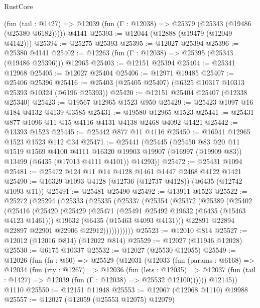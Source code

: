 \begin{lexlean}{RustCore}
\begin{coremodule}
    (fun (tail : @1427) => @12039 (fun (Γ : @12038) => @25379 (@25343 (@19486 (@25380 @6182)))))
    @4141
@25393 := @12044 (@12888 (@19479 (@12049 @4142)))
@25394 := @25275 @25393
@25395 := @12027 @25394
@25396 := @25380 @4141
@25402 := @12263 (fun (Γ : @12038) => @25395 (@25343 (@19486 @25396))) @12965
@25403 := @12151 @25394
@25404 := @25341 @12968
@25405 := @12027 @25404
@25406 := @12971 @19485
@25407 := @25406 @25396
@25416 := @25403 (@25405 @25407) (@6325 @10317 @10313 @25393 @10324 (@6196 @25393))
@25420 := @12151 @25404 @25407 (@12338 @25340)
@25423 := @19567 @12965 @1523 @950
@25429 := @25423 @1097 @16 @184 @4132 @4139 @3585
@25431 := @19580 @12965 @1523
@25441 := @25431 @877 @1096 @11 @15 @4116 @4131 @4138 @2468 @4092 @1421
@25442 := @13393 @1523
@25445 := @25442 @877 @11 @4116
@25450 := @16941 @12965 @1523 @1523 @112 @34
@25471 := @25441
    (@25445
      (@25450
        @83
        @20
        @11
        @1519
        @1569
        @4100
        @4111
        @16320
        @19903
        @19907
        (@16997 (@19909 @83))
        @13499
        (@6435 (@17013 @4111 @4101))
        @14293))
@25472 := @25431 @1094
@25481 := @25472 @124 @11 @14 @4128 @1461 @1447 @2468 @4122 @1421
@25490 := @16329 @1093 @4128 (@12736 (@12737 @4128)) (@6435 (@12742 @1093 @11))
@25491 := @25481 @25490
@25492 := @13911 @1523
@25522 := @25272
    (@25294
      (@25333
        (@25335
          (@25337
            (@25354
              (@25372
                (@25389
                  (@25402
                    (@25416
                      (@25420
                        (@25429
                          (@25471
                            (@25491 @25492 @19632 (@6435 (@15463 @4123 @1461)))
                            @19632
                            (@6435 (@15463 @4093 @4131)))
                          @22891
                          @22894
                          @22897
                          @22901
                          @22906
                          @22912)))))))))))
@25523 := @12010 @814
@25527 := @12012 (@12016 @814) (@12022 @814)
@25529 := @12027 (@11946 @12028)
@25530 := @6175 @10337
@25532 := @12027 (@25530 @12055)
@25549 := @12026
    (fun (fn : @60) =>
    @25529
      (@12031
        (@12033
          (fun (params : @6168) =>
          @12034
            (fun (rty : @1267) =>
            @12036
              (fun (lets : @12035) =>
              @12037 (fun (tail : @1427) => @12039 (fun (Γ : @12038) => @25532 @12100))))))
        @12145))
    @1110
@25550 := @12151 @11948
@25553 := @12067 (@12068 @1110) @19988
@25557 := @12027 (@12059 (@25553 @12075) @12079)

\end{coremodule}
\end{lexlean}
